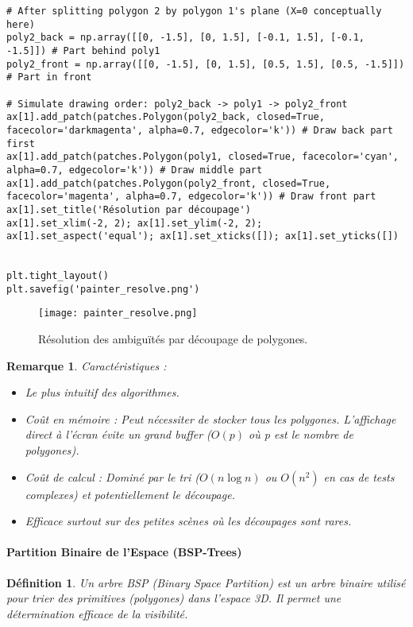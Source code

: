 \documentclass{article}
\newtheorem{definition}{Définition}
\newtheorem{remark}{Remarque}
\begin{document}
{\begin{verbatim}
# After splitting polygon 2 by polygon 1's plane (X=0 conceptually here)
poly2_back = np.array([[0, -1.5], [0, 1.5], [-0.1, 1.5], [-0.1, -1.5]]) # Part behind poly1
poly2_front = np.array([[0, -1.5], [0, 1.5], [0.5, 1.5], [0.5, -1.5]]) # Part in front

# Simulate drawing order: poly2_back -> poly1 -> poly2_front
ax[1].add_patch(patches.Polygon(poly2_back, closed=True, facecolor='darkmagenta', alpha=0.7, edgecolor='k')) # Draw back part first
ax[1].add_patch(patches.Polygon(poly1, closed=True, facecolor='cyan', alpha=0.7, edgecolor='k')) # Draw middle part
ax[1].add_patch(patches.Polygon(poly2_front, closed=True, facecolor='magenta', alpha=0.7, edgecolor='k')) # Draw front part
ax[1].set_title('Résolution par découpage')
ax[1].set_xlim(-2, 2); ax[1].set_ylim(-2, 2); ax[1].set_aspect('equal'); ax[1].set_xticks([]); ax[1].set_yticks([])


plt.tight_layout()
plt.savefig('painter_resolve.png')
\end{verbatim}

\begin{figure}[H]
\centering
\texttt{[image: painter\_resolve.png]}
\caption{Résolution des ambiguïtés par découpage de polygones.}
\label{fig:painter_resolve}
\end{figure}

\begin{remark}
Caractéristiques :
\begin{itemize}
    \item Le plus intuitif des algorithmes.
    \item Coût en mémoire : Peut nécessiter de stocker tous les polygones. L'affichage direct à l'écran évite un grand buffer ($O(p)$ où p est le nombre de polygones).
    \item Coût de calcul : Dominé par le tri ($O(n \log n)$ ou $O(n^2)$ en cas de tests complexes) et potentiellement le découpage.
    \item Efficace surtout sur des petites scènes où les découpages sont rares.
\end{itemize}
\end{remark}


\paragraph{Partition Binaire de l'Espace (BSP-Trees)}
\begin{definition}
Un arbre BSP (Binary Space Partition) est un arbre binaire utilisé pour trier des primitives (polygones) dans l'espace 3D. Il permet une détermination efficace de la visibilité.
\end{definition}

}
\end{document}
